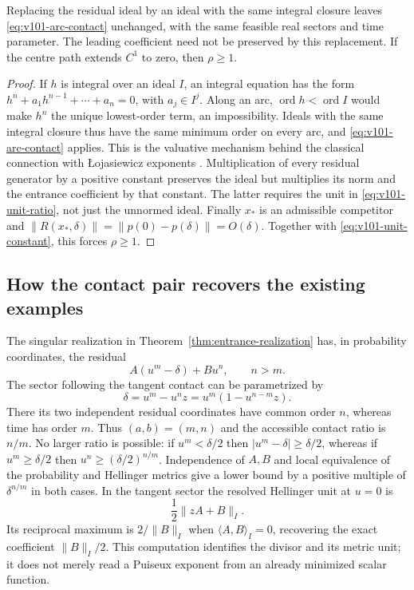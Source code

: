 \begin{corollary}\label{cor:v101-integral}
Replacing the residual ideal by an ideal with the same integral closure
leaves \eqref{eq:v101-arc-contact} unchanged, with the same feasible
real sectors and time parameter. The leading coefficient need not be
preserved by this replacement. If the centre path extends $C^1$ to zero,
then $\rho\ge1$.
\end{corollary}
\begin{proof}
If $h$ is integral over an ideal $I$, an integral equation has the form
$h^n+a_1h^{n-1}+\cdots+a_n=0$, with $a_j\in I^j$. Along an arc,
$\operatorname{ord}h<\operatorname{ord}I$ would make $h^n$ the unique
lowest-order term, an impossibility. Ideals with the same integral
closure thus have the same minimum order on every arc, and
\eqref{eq:v101-arc-contact} applies. This is the valuative mechanism
behind the classical connection with \L{}ojasiewicz exponents
\cite{A2LJT08}. Multiplication of every residual generator by a positive
constant preserves the ideal but multiplies its norm and the entrance
coefficient by that constant. The latter requires the unit in
\eqref{eq:v101-unit-ratio}, not just the unnormed ideal.
Finally $x_*$ is an admissible competitor and
$\|R(x_*,\delta)\|=\|p(0)-p(\delta)\|=O(\delta)$.
Together with \eqref{eq:v101-unit-constant}, this forces $\rho\ge1$.
\end{proof}

\subsection{How the contact pair recovers the existing examples}
The singular realization in Theorem~\ref{thm:entrance-realization}
has, in probability coordinates, the residual
\[
 A(u^m-\delta)+Bu^n,\qquad n>m.
\]
The sector following the tangent contact can be parametrized by
\[
 \delta=u^m-u^n z=u^m(1-u^{n-m}z).
\]
There its two independent residual coordinates have common order $n$,
whereas time has order $m$. Thus $(a,b)=(m,n)$ and the accessible
contact ratio is $n/m$. No larger ratio is possible: if $u^m<\delta/2$
then $|u^m-\delta|\ge\delta/2$, whereas if $u^m\ge\delta/2$ then
$u^n\ge(\delta/2)^{n/m}$. Independence of $A,B$ and local equivalence
of the probability and Hellinger metrics give a lower bound by a
positive multiple of $\delta^{n/m}$ in both cases. In the tangent
sector the resolved Hellinger unit at $u=0$ is
\[
 \frac12\|zA+B\|_I.
\]
Its reciprocal maximum is $2/\|B\|_I$ when
$\langle A,B\rangle_I=0$, recovering the exact coefficient
$\|B\|_I/2$. This computation identifies the divisor and its metric
unit; it does not merely read a Puiseux exponent from an already
minimized scalar function.


